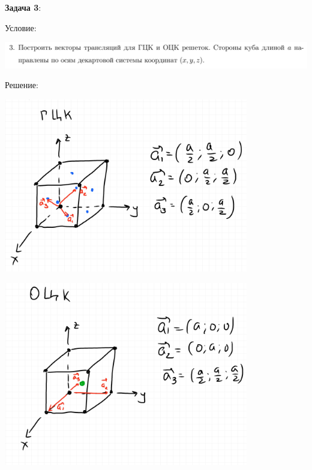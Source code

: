\documentclass[12pt]{article}
\begin{document}
\begin{large}
\par \textbf{Задача 3}:
\par Условие:
\par
\includegraphics[width=1\textwidth]{photo_3.png}
\par Решение:
\par
\includegraphics[width=0.8\textwidth]{photo_31.jpg}
\par
\includegraphics[width=0.8\textwidth]{photo_32.jpg}


\end{large}
\end{document}

